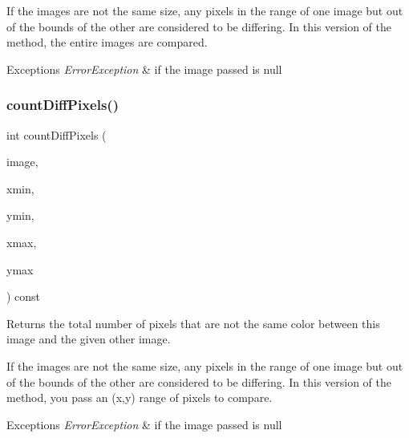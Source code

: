 If the images are not the same size, any pixels in the range of one image but out of the bounds of the other are considered to be differing. In this version of the method, the entire images are compared. 
\begin{DoxyExceptions}{Exceptions}
{\em Error\+Exception} & if the image passed is null \\
\hline
\end{DoxyExceptions}
\mbox{\label{classsgl_1_1GCanvas_a77b38a94630c93ecc697fb12a1fb89fd}} 
\subsubsection{\texorpdfstring{count\+Diff\+Pixels()}{countDiffPixels()}\hspace{0.1cm}{\footnotesize\ttfamily [4/4]}}
{\footnotesize\ttfamily int count\+Diff\+Pixels (\begin{DoxyParamCaption}\item[{const \mbox{\hyperlink{classsgl_1_1GCanvas}{G\+Canvas}} $\ast$}]{image,  }\item[{int}]{xmin,  }\item[{int}]{ymin,  }\item[{int}]{xmax,  }\item[{int}]{ymax }\end{DoxyParamCaption}) const\hspace{0.3cm}{\ttfamily [virtual]}}



Returns the total number of pixels that are not the same color between this image and the given other image. 

If the images are not the same size, any pixels in the range of one image but out of the bounds of the other are considered to be differing. In this version of the method, you pass an (x,y) range of pixels to compare. 
\begin{DoxyExceptions}{Exceptions}
{\em Error\+Exception} & if the image passed is null \\
\hline
\end{DoxyExceptions}
\mbox{\label{classsgl_1_1GCanvas_a5ef799a28166a7f009365102168a2d06}} 
